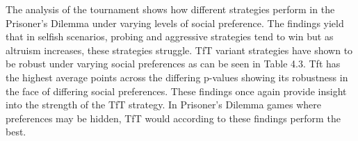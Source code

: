 \documentclass[11pt,preprint]{elsarticle}
\let\origtable\table
\let\endorigtable\endtable
\renewenvironment{table}[1][2] {
    \expandafter\origtable\expandafter[H]
} {
    \endorigtable
}
\numberwithin{equation}{section}
\numberwithin{figure}{section}
\numberwithin{table}{section}
\begin{document}
The analysis of the tournament shows how different strategies perform in
the Prisoner's Dilemma under varying levels of social preference. The
findings yield that in selfish scenarios, probing and aggressive
strategies tend to win but as altruism increases, these strategies
struggle. TfT variant strategies have shown to be robust under varying
social preferences as can be seen in Table 4.3. Tft has the highest
average points across the differing p-values showing its robustness in
the face of differing social preferences. These findings once again
provide insight into the strength of the TfT strategy. In Prisoner's
Dilemma games where preferences may be hidden, TfT would according to
these findings perform the best.

\begin{table}[!h]
\centering
\caption{\label{tab:unnamed-chunk-7}Strategy Values Across Different p Values}
\centering
{}
\end{table}
\end{document}
